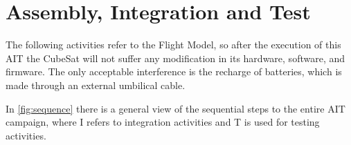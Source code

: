 %
%
%
%
%

%
%
%
%
%
%

\chapter{Assembly, Integration and Test} \label{ch:ait}

The following activities refer to the Flight Model, so after the execution of this AIT the CubeSat will not suffer any modification in its hardware, software, and firmware. The only acceptable interference is the recharge of batteries, which is made through an external umbilical cable.

In \autoref{fig:sequence} there is a general view of the sequential steps to the entire AIT campaign, where I refers to integration activities and T is used for testing activities.





